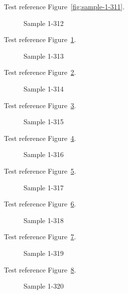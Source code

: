 Test reference Figure~\ref{fig:sample-1-311}.

\begin{figure}[tbhp]
\caption{Sample 1-312}
\label{fig:sample-1-312}
\end{figure}

Test reference Figure~\ref{fig:sample-1-312}.

\begin{figure}[tbhp]
\caption{Sample 1-313}
\label{fig:sample-1-313}
\end{figure}

Test reference Figure~\ref{fig:sample-1-313}.

\begin{figure}[tbhp]
\caption{Sample 1-314}
\label{fig:sample-1-314}
\end{figure}

Test reference Figure~\ref{fig:sample-1-314}.

\begin{figure}[tbhp]
\caption{Sample 1-315}
\label{fig:sample-1-315}
\end{figure}

Test reference Figure~\ref{fig:sample-1-315}.

\begin{figure}[tbhp]
\caption{Sample 1-316}
\label{fig:sample-1-316}
\end{figure}

Test reference Figure~\ref{fig:sample-1-316}.

\begin{figure}[tbhp]
\caption{Sample 1-317}
\label{fig:sample-1-317}
\end{figure}

Test reference Figure~\ref{fig:sample-1-317}.

\begin{figure}[tbhp]
\caption{Sample 1-318}
\label{fig:sample-1-318}
\end{figure}

Test reference Figure~\ref{fig:sample-1-318}.

\begin{figure}[tbhp]
\caption{Sample 1-319}
\label{fig:sample-1-319}
\end{figure}

Test reference Figure~\ref{fig:sample-1-319}.

\begin{figure}[tbhp]
\caption{Sample 1-320}
\label{fig:sample-1-320}
\end{figure}


